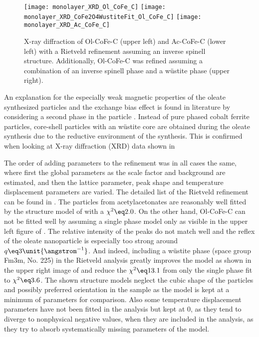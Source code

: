 \documentclass[\main/dresen_thesis.tex]{subfiles}
\begin{document}
    \begin{figure}[tb]
      \centering
      \texttt{[image: monolayer\_XRD\_Ol\_CoFe\_C]}
      \texttt{[image: monolayer\_XRD\_CoFe2O4WustiteFit\_Ol\_CoFe\_C]}
      \texttt{[image: monolayer\_XRD\_Ac\_CoFe\_C]}
      \caption{\label{fig:monolayers:nanoparticle:xrd}X-ray diffraction of Ol-CoFe-C (upper left) and Ac-CoFe-C (lower left) with a Rietveld refinement assuming an inverse spinell structure. Additionally, Ol-CoFe-C was refined assuming a combination of an inverse spinell phase and a w\"ustite phase (upper right).}
    \end{figure}

    An explanation for the especially weak magnetic properties of the oleate synthesized particles and the exchange bias effect is found in literature by considering a second phase in the particle \cite{Bodnarchuk_2009_Excha, Wetterskog_2013_Anoma}.
    Instead of pure phased cobalt ferrite particles, core-shell particles with an w\"ustite core are obtained during the oleate synthesis due to the reductive environment of the synthesis.
    This is confirmed when looking at X-ray diffraction (XRD) data shown in 


    The order of adding parameters to the refinement was in all cases the same, where first the global parameters as the scale factor and background are estimated, and then the lattice parameter, peak shape and temperature displacement parameters are varied.
    The detailed list of the Rietveld refinement can be found in .
    The particles from acetylacetonates are reasonably well fitted by the structure model of  with a $\chi^2 \eq 2.0$.
    On the other hand, Ol-CoFe-C can not be fitted well by assuming a single phase model only as visible in the upper left figure of .
    The relative intensity of the peaks do not match well and the reflex of the oleate nanoparticle is especially too strong around $q \eq 3 \unit{\angstrom^{-1}}$.
    And indeed, including a w\"ustite phase (space group Fm3m, No. 225) in the Rietveld analysis greatly improves the model as shown in the upper right image of  and reduce the $\chi^2 \eq 13.1$ from only the single phase fit to $\chi^2 \eq 3.6$.
    The shown structure models neglect the cubic shape of the particles and possibly preferred orientation in the sample as the model is kept at a minimum of parameters for comparison.
    Also some temperature displacement parameters have not been fitted in the analysis but kept at $0$, as they tend to diverge to nonphysical negative values, when they are included in the analysis, as they try to absorb systematically missing parameters of the model.
\end{document}
